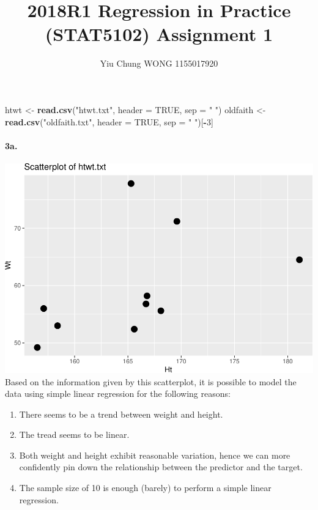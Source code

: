 \documentclass[]{article}
\title{2018R1 Regression in Practice (STAT5102) Assignment 1}
\author{Yiu Chung WONG 1155017920}
\date{}
\newenvironment{Shaded}{\begin{snugshade}}{\end{snugshade}}
\newcommand{\KeywordTok}[1]{\textcolor[rgb]{0.13,0.29,0.53}{\textbf{#1}}}
\newcommand{\DataTypeTok}[1]{\textcolor[rgb]{0.13,0.29,0.53}{#1}}
\newcommand{\DecValTok}[1]{\textcolor[rgb]{0.00,0.00,0.81}{#1}}
\newcommand{\StringTok}[1]{\textcolor[rgb]{0.31,0.60,0.02}{#1}}
\newcommand{\OtherTok}[1]{\textcolor[rgb]{0.56,0.35,0.01}{#1}}
\newcommand{\OperatorTok}[1]{\textcolor[rgb]{0.81,0.36,0.00}{\textbf{#1}}}
\newcommand{\NormalTok}[1]{#1}
\providecommand{\tightlist}{%
  \setlength{\itemsep}{0pt}\setlength{\parskip}{0pt}}
\let\oldparagraph\paragraph
\renewcommand{\paragraph}[1]{\oldparagraph{#1}\mbox{}}
\begin{document}
\maketitle

\begin{Shaded}
\begin{Highlighting}[]
\NormalTok{htwt <-}\StringTok{ }\KeywordTok{read.csv}\NormalTok{(}\StringTok{"htwt.txt"}\NormalTok{, }\DataTypeTok{header =} \OtherTok{TRUE}\NormalTok{, }\DataTypeTok{sep =} \StringTok{" "}\NormalTok{)}
\NormalTok{oldfaith <-}\StringTok{ }\KeywordTok{read.csv}\NormalTok{(}\StringTok{"oldfaith.txt"}\NormalTok{, }\DataTypeTok{header =} \OtherTok{TRUE}\NormalTok{, }\DataTypeTok{sep =} \StringTok{" "}\NormalTok{)[}\OperatorTok{-}\DecValTok{3}\NormalTok{]}
\end{Highlighting}
\end{Shaded}

\paragraph{3a.}\label{a.}

\includegraphics{Assignment_1_files/figure-latex/unnamed-chunk-4-1.pdf}
Based on the information given by this scatterplot, it is possible to
model the data using simple linear regression for the following reasons:

\begin{enumerate}
\def\labelenumi{\arabic{enumi}.}
\tightlist
\item
  There seems to be a trend between weight and height.
\item
  The tread seems to be linear.
\item
  Both weight and height exhibit reasonable variation, hence we can more
  confidently pin down the relationship between the predictor and the
  target.
\item
  The sample size of 10 is enough (barely) to perform a simple linear
  regression. 
\end{enumerate}
\end{document}
